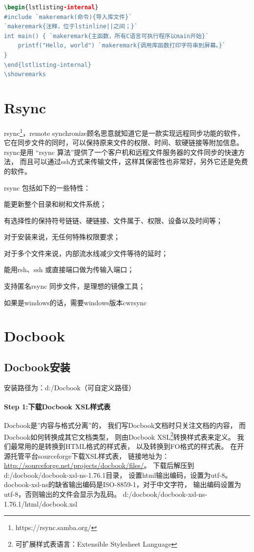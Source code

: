 \documentclass{book}
\newcounter{coderemarks}   %
\newcounter{codevar}     %
\newcommand{\circlemark}[1]{%
\tikz\node[text=white,font=\sffamily\bfseries,inner sep=0.2mm,draw,circle,fill=black]{#1};}
\newcommand{\showremarks}{%
\begin{list}{\circlemark{\arabic{codevar}}} %
{} %
\whiledo{\value{codevar} < \value{coderemarks}}{ %
\item \expandafter\csname codebox\the\value{codevar}\endcsname %
\stepcounter{codevar}} %
\end{list} %
\setcounter{coderemarks}{1}%
\setcounter{codevar}{1}%
}
\begin{document}
\begin{lstlisting}[language=TeX]
\begin{lstlisting-internal}
#include `makeremark(命令){导入库文件}`
`makeremark{注释，位于lstinline||之间；}`
int main() { `makeremark{主函数，所有C语言可执行程序以main开始}`
    printf("Hello, world") `makeremark{调用库函数打印字符串到屏幕。}`
}
\end{lstlisting-internal}
\showremarks
\end{lstlisting}

\section{Rsync}

rsync\footnote{https://rsync.samba.org/}，remote synchronize顾名思意就知道它是一款实现远程同步功能的软件，
它在同步文件的同时，可以保持原来文件的权限、时间、软硬链接等附加信息。 
rsync是用 “rsync 算法”提供了一个客户机和远程文件服务器的文件同步的快速方法，
而且可以通过ssh方式来传输文件，这样其保密性也非常好，另外它还是免费的软件。

rsync 包括如下的一些特性：

能更新整个目录和树和文件系统；

有选择性的保持符号链链、硬链接、文件属于、权限、设备以及时间等；

对于安装来说，无任何特殊权限要求；

对于多个文件来说，内部流水线减少文件等待的延时；

能用rsh、ssh 或直接端口做为传输入端口；

支持匿名rsync 同步文件，是理想的镜像工具；

如果是windows的话，需要windows版本cwrsync

\section{Docbook}

\subsection{Docbook安装}

安装路径为：d:/Docbook（可自定义路径）

\paragraph{Step 1:下载Docbook XSL样式表}

Docbook是”内容与格式分离”的，
我们写Docbook文档时只关注文档的内容，
而Docbook如何转换成其它文档类型，
则由Docbook XSL\footnote{可扩展样式表语言：Extensible Stylesheet Language}转换样式表来定义。
我们最常用的是转换到HTML格式的样式表，
以及转换到FO格式的样式表。 
在开源托管平台sourceforge下载XSL样式表，
链接地址为：\url{http://sourceforge.net/projects/docbook/files/}。
下载后解压到d:/docbook/docbook-xsl-ns-1.76.1目录，
设置html输出编码，设置为utf-8。
docbook-xsl-ns的缺省输出编码是ISO-8859-1，对于中文字符，
输出编码设置为utf-8，否则输出的文件会显示为乱码。
d:/docbook/docbook-xsl-ns-1.76.1/html/docbook.xsl
\end{document}
